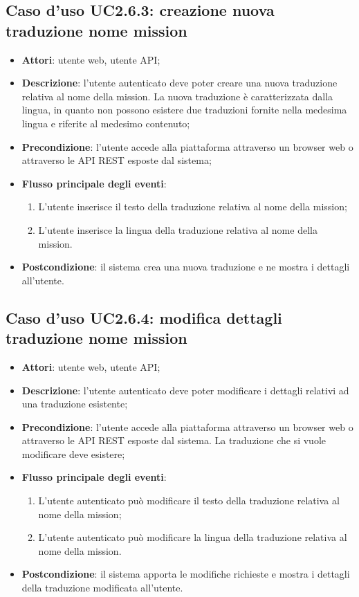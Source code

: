 \subsection{Caso d'uso UC2.6.3: creazione nuova traduzione nome mission}
\begin{itemize}
\item \textbf{Attori}: utente web, utente API;
\item \textbf{Descrizione}: l'utente autenticato deve poter creare una nuova traduzione relativa al nome della mission. La nuova traduzione è caratterizzata dalla lingua, in quanto non possono esistere due traduzioni fornite nella medesima lingua e riferite al medesimo contenuto; 
      \item \textbf{Precondizione}: l'utente accede alla piattaforma attraverso un browser web o attraverso le API REST esposte dal sistema;

        \item \textbf{Flusso principale degli eventi}:
          \begin{enumerate}
          \item L'utente inserisce il testo della traduzione relativa al nome della mission;
          \item L'utente inserisce la lingua della traduzione relativa al nome della mission.

      \end{enumerate}
    \item \textbf{Postcondizione}: il sistema crea una nuova traduzione e ne mostra i dettagli all'utente.
  \end{itemize}
\hypertarget{UC2.6.4}{}
\subsection{Caso d'uso UC2.6.4: modifica dettagli traduzione nome mission}
\begin{itemize}
\item \textbf{Attori}: utente web, utente API;
\item \textbf{Descrizione}: l'utente autenticato deve poter modificare i dettagli relativi ad una traduzione esistente; 
      \item \textbf{Precondizione}: l'utente accede alla piattaforma attraverso un browser web o attraverso le API REST esposte dal sistema. La traduzione che si vuole modificare deve esistere;

        \item \textbf{Flusso principale degli eventi}:
          \begin{enumerate}
          \item L'utente autenticato può modificare il testo della traduzione relativa al nome della mission;
          \item L'utente autenticato può modificare la lingua della traduzione relativa al nome della mission.

      \end{enumerate}
    \item \textbf{Postcondizione}: il sistema apporta le modifiche richieste e mostra i dettagli della traduzione modificata all'utente.
  \end{itemize}
\hypertarget{UC2.6.5}{}
